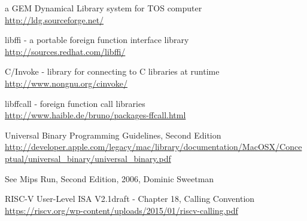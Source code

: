\begin{thebibliography}{99}
	a GEM Dynamical Library system for TOS computer\\
	\url{http://ldg.sourceforge.net/}

	libffi - a portable foreign function interface library\\
	\url{http://sources.redhat.com/libffi/}

	C/Invoke - library for connecting to C libraries at runtime\\
	\url{http://www.nongnu.org/cinvoke/}

	libffcall - foreign function call libraries\\
	\url{http://www.haible.de/bruno/packages-ffcall.html}

	Universal Binary Programming Guidelines, Second Edition\\
	\url{http://developer.apple.com/legacy/mac/library/documentation/MacOSX/Conceptual/universal\_binary/universal\_binary.pdf}

	See Mips Run, Second Edition, 2006, Dominic Sweetman

	RISC-V User-Level ISA V2.1draft - Chapter 18, Calling Convention \\
	\url{https://riscv.org/wp-content/uploads/2015/01/riscv-calling.pdf}

\end{thebibliography}

